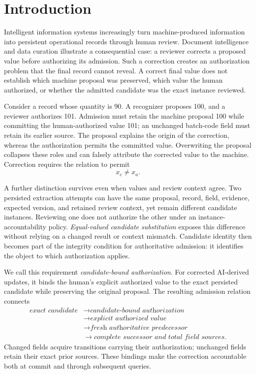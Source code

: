 \section{Introduction}
\label{sec:introduction}
Intelligent information systems increasingly turn machine-produced information into persistent operational records through human review. Document intelligence and data curation illustrate a consequential case: a reviewer corrects a proposed value before authorizing its admission. Such a correction creates an authorization problem that the final record cannot reveal. A correct final value does not establish which machine proposal was preserved, which value the human authorized, or whether the admitted candidate was the exact instance reviewed.

Consider a record whose quantity is 90. A recognizer proposes 100, and a reviewer authorizes 101. Admission must retain the machine proposal 100 while committing the human-authorized value 101; an unchanged batch-code field must retain its earlier source. The proposal explains the origin of the correction, whereas the authorization permits the committed value. Overwriting the proposal collapses these roles and can falsely attribute the corrected value to the machine. Correction requires the relation to permit
\begin{equation}
x_c\neq x_a.
\label{eq:intro-correction}
\end{equation}

A further distinction survives even when values and review context agree. Two persisted extraction attempts can have the same proposal, record, field, evidence, expected version, and retained review context, yet remain different candidate instances. Reviewing one does not authorize the other under an instance-accountability policy. \emph{Equal-valued candidate substitution} exposes this difference without relying on a changed result or context mismatch. Candidate identity then becomes part of the integrity condition for authoritative admission: it identifies the object to which authorization applies.

We call this requirement \emph{candidate-bound authorization}. For corrected AI-derived updates, it binds the human's explicit authorized value to the exact persisted candidate while preserving the original proposal. The resulting admission relation connects
\begin{equation}
\begin{aligned}
\textit{exact candidate}
&\rightarrow\textit{candidate-bound authorization}\\
&\rightarrow\textit{explicit authorized value}\\
&\rightarrow\textit{fresh authoritative predecessor}\\
&\rightarrow\textit{complete successor and total field sources}.
\end{aligned}
\label{eq:admission-chain}
\end{equation}
Changed fields acquire transitions carrying their authorization; unchanged fields retain their exact prior sources. These bindings make the correction accountable both at commit and through subsequent queries.

